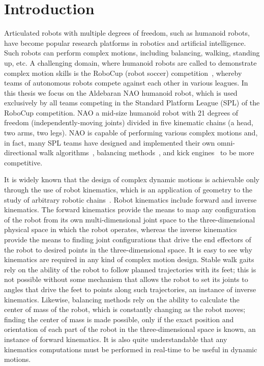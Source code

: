 \chapter{Introduction}
\label{intro}

Articulated robots with multiple degrees of freedom, such as humanoid robots, have become popular research platforms in robotics and artificial intelligence. Such robots can perform complex motions, including balancing, walking, standing up, etc. A challenging domain, where humanoid robots are called to demonstrate complex motion skills is the RoboCup (robot soccer) competition~\cite{robocup}, whereby teams of autonomous robots compete against each other in various leagues. In this thesis we focus on the Aldebaran NAO humanoid robot, which is used exclusively by all teams competing in the Standard Platform League (SPL) of the RoboCup competition. NAO a mid-size humanoid robot with 21 degrees of freedom (independently-moving joints) divided in five kinematic chains (a head, two arms, two legs). NAO is capable of performing various complex motions and, in fact, many SPL teams have designed and implemented their own omni-directional walk algorithms~\cite{naowalk,bhumanwalk}, balancing methods~\cite{nimbrobalancing}, and kick engines~\cite{bhumankick} to be more competitive. 

It is widely known that the design of complex dynamic motions is achievable only through the use of robot kinematics, which is an application of geometry to the study of arbitrary robotic chains~\cite{introroboticscraigbook}. Robot kinematics include forward and inverse kinematics. The forward kinematics provide the means to map any configuration of the robot from its own multi-dimensional joint space to the three-dimensional physical space in which the robot operates, whereas the inverse kinematics provide the means to finding joint configurations that drive the end effectors of the robot to desired points in the three-dimensional space. It is easy to see why kinematics are required in any kind of complex motion design. Stable walk gaits rely on the ability of the robot to follow planned trajectories with its feet; this is not possible without some mechanism that allows the robot to set its joints to angles that drive the feet to points along such trajectories, an instance of inverse kinematics. Likewise, balancing methods rely on the ability to calculate the center of mass of the robot, which is constantly changing as the robot moves; finding the center of mass is made possible, only if the exact position and orientation of each part of the robot in the three-dimensional space is known, an instance of forward kinematics. It is also quite understandable that any kinematics computations must be performed in real-time to be useful in dynamic motions. 


